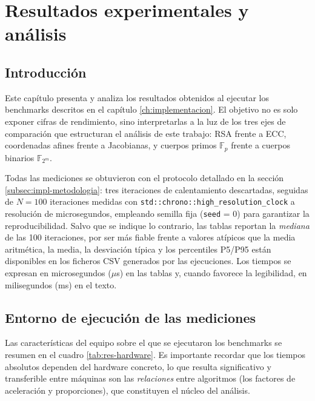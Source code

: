 %

\chapter{Resultados experimentales y análisis}
\label{ch:resultados}

\section{Introducción}
\label{sec:res-intro}

Este capítulo presenta y analiza los resultados obtenidos al ejecutar los benchmarks descritos en el capítulo \ref{ch:implementacion}. El objetivo no es solo exponer cifras de rendimiento, 
sino interpretarlas a la luz de los tres ejes de comparación que estructuran el análisis de este trabajo: RSA frente a ECC, coordenadas afines frente a Jacobianas, y cuerpos primos $\mathbb{F}_p$ 
frente a cuerpos binarios $\mathbb{F}_{2^m}$.

Todas las mediciones se obtuvieron con el protocolo detallado en la sección \ref{subsec:impl-metodologia}: tres iteraciones de calentamiento descartadas, seguidas de $N = 100$ iteraciones 
medidas con \texttt{std::chrono::high\_resolution\_clock} a resolución de microsegundos, empleando semilla fija (\texttt{seed} = 0) para garantizar la reproducibilidad. Salvo que se indique 
lo contrario, las tablas reportan la \emph{mediana} de las 100 iteraciones, por ser más fiable frente a valores atípicos que la media aritmética, la media, la desviación típica y los 
percentiles P5/P95 están disponibles en los ficheros CSV generados por las ejecuciones. Los tiempos se expresan en microsegundos ($\mu$s) en las tablas y, cuando favorece la legibilidad, 
en milisegundos (ms) en el texto.

\section{Entorno de ejecución de las mediciones}
\label{sec:res-entorno}

Las características del equipo sobre el que se ejecutaron los benchmarks se resumen en el cuadro \ref{tab:res-hardware}. Es importante recordar que los tiempos absolutos dependen del 
hardware concreto, lo que resulta significativo y transferible entre máquinas son las \emph{relaciones} entre algoritmos (los factores de aceleración y proporciones), que constituyen 
el núcleo del análisis.

